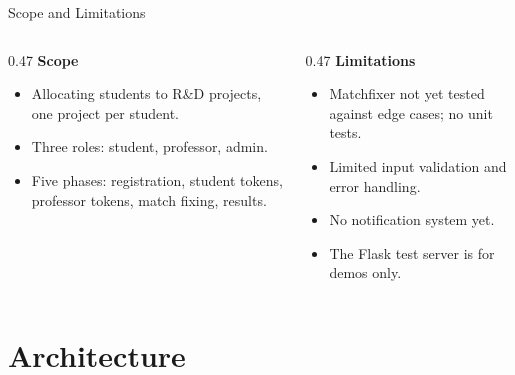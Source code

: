 \documentclass[12pt, aspectratio=169]{beamer}
\begin{document}
\begin{frame}{Scope and Limitations}
\begin{columns}[T,onlytextwidth]
  \begin{column}{0.47\textwidth}
    \textbf{Scope}
    \begin{itemize}
      \item Allocating students to R\&D projects, one project per student.
      \item Three roles: student, professor, admin.
      \item Five phases: registration, student tokens, professor tokens,
        match fixing, results.
    \end{itemize}
  \end{column}
  \begin{column}{0.47\textwidth}
    \textbf{Limitations}
    \begin{itemize}
      \item Matchfixer not yet tested against edge cases; no unit tests.
      \item Limited input validation and error handling.
      \item No notification system yet.
      \item The Flask test server is for demos only.
    \end{itemize}
  \end{column}
\end{columns}
\end{frame}

\section{Architecture}
\end{document}
